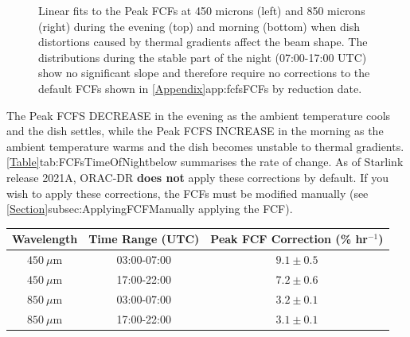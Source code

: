 \begin{figure}
\begin{center}
\caption[FCFs Time of Night Fits]{Linear fits to the Peak FCFs at 450 microns (left) and 850 microns (right)
 during the evening (top) and morning (bottom) when dish distortions caused by thermal gradients affect the 
 beam shape. The distributions during the stable part of the night (07:00-17:00 UTC) show no significant 
 slope and therefore require no corrections to the default FCFs shown in
 \cref{Appendix}{app:fcfs}{FCFs by reduction date}. \label{fig:FCFsTimeOfNightFits}}
\end{center}
\end{figure}


The Peak FCFS DECREASE in the evening as the ambient temperature cools and the dish settles, while
the Peak FCFS INCREASE in the morning as the ambient temperature warms and the dish becomes
unstable to thermal gradients. \cref{Table}{tab:FCFsTimeOfNight}{below} summarises the rate of change.
As of Starlink release 2021A, ORAC-DR \textbf{does not} apply these corrections by default. If
you wish to apply these corrections, the FCFs must be modified manually (see
\cref{Section}{subsec:ApplyingFCF}{Manually applying the FCF}).


\begin{table}[h!]
\begin{center}
\begin{tabular}{|c|c|c|}
 \hline
 \multicolumn{1}{|c|}{Wavelength} &
 \multicolumn{1}{c|}{Time Range (UTC)} &
 \multicolumn{1}{c|}{Peak FCF Correction (\% hr$^{-1}$)}
 \\ \hline
$450~\mu$m & 03:00-07:00 & $9.1\pm0.5$ \\
$450~\mu$m & 17:00-22:00 & $7.2\pm0.6$ \\
\hline
$850~\mu$m & 03:00-07:00 & $3.2\pm0.1$ \\
$850~\mu$m & 17:00-22:00 & $3.1\pm0.1$ \\ \hline
\end{tabular}
\end{center}
\label{tab:FCFsTimeOfNight}
\end{table}

